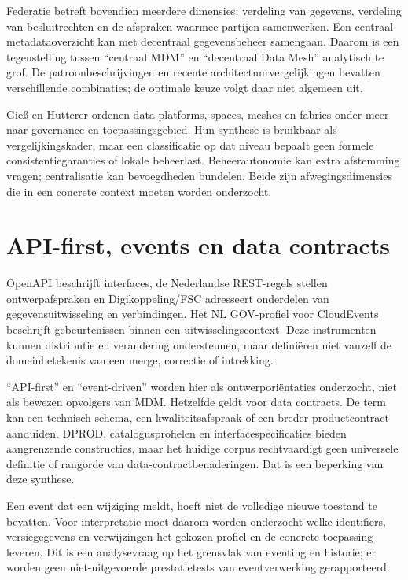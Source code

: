 Federatie betreft bovendien meerdere dimensies: verdeling van gegevens, verdeling van besluitrechten en de afspraken waarmee partijen samenwerken. Een centraal metadataoverzicht kan met decentraal gegevensbeheer samengaan. Daarom is een tegenstelling tussen ``centraal MDM'' en ``decentraal Data Mesh'' analytisch te grof. De patroonbeschrijvingen en recente architectuurvergelijkingen bevatten verschillende combinaties; de optimale keuze volgt daar niet algemeen uit. \parencite{L20,L23,L24}

Gieß en Hutterer ordenen data platforms, spaces, meshes en fabrics onder meer naar governance en toepassingsgebied. Hun synthese is bruikbaar als vergelijkingskader, maar een classificatie op dat niveau bepaalt geen formele consistentiegaranties of lokale beheerlast. Beheerautonomie kan extra afstemming vragen; centralisatie kan bevoegdheden bundelen. Beide zijn afwegingsdimensies die in een concrete context moeten worden onderzocht. \parencite{L24}

\section{API-first, events en data contracts}
OpenAPI beschrijft interfaces, de Nederlandse REST-regels stellen ontwerpafspraken en Digikoppeling/FSC adresseert onderdelen van gegevensuitwisseling en verbindingen. Het NL GOV-profiel voor CloudEvents beschrijft gebeurtenissen binnen een uitwisselingscontext. Deze instrumenten kunnen distributie en verandering ondersteunen, maar definiëren niet vanzelf de domeinbetekenis van een merge, correctie of intrekking. \parencite{S19,S18,S20,S21,S22}

``API-first'' en ``event-driven'' worden hier als ontwerporiëntaties onderzocht, niet als bewezen opvolgers van MDM. Hetzelfde geldt voor data contracts. De term kan een technisch schema, een kwaliteitsafspraak of een breder productcontract aanduiden. DPROD, catalogusprofielen en interfacespecificaties bieden aangrenzende constructies, maar het huidige corpus rechtvaardigt geen universele definitie of rangorde van data-contractbenaderingen. Dat is een beperking van deze synthese. \parencite{S51,S47,S19}

Een event dat een wijziging meldt, hoeft niet de volledige nieuwe toestand te bevatten. Voor interpretatie moet daarom worden onderzocht welke identifiers, versiegegevens en verwijzingen het gekozen profiel en de concrete toepassing leveren. Dit is een analysevraag op het grensvlak van eventing en historie; er worden geen niet-uitgevoerde prestatietests van eventverwerking gerapporteerd. \parencite{S22,S37}

